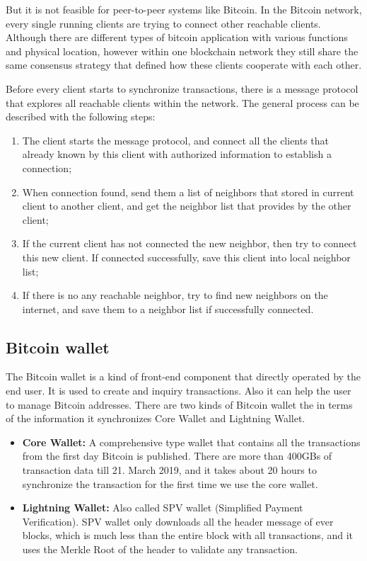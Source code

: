 \documentclass[runningheads]{llncs}
\begin{document}
But it is not feasible for peer-to-peer systems like Bitcoin. In the Bitcoin network, every single running clients are trying to connect other reachable clients. Although there are different types of bitcoin application with various functions and physical location, however within one blockchain network they still share the same consensus strategy that defined how these clients cooperate with each other.

Before every client starts to synchronize transactions, there is a message protocol that explores all reachable clients within the network\cite{asharaf2017decentralized}. The general process can be described with the following steps:

\begin{enumerate}
	\item The client starts the message protocol, and connect all the clients that already known by this client with authorized information to establish a connection;
	\item When connection found, send them a list of neighbors that stored in current client to another client, and get the neighbor list that provides by the other client;
	\item If the current client has not connected the new neighbor, then try to connect this new client. If connected successfully, save this client into local neighbor list;
	\item If there is no any reachable neighbor, try to find new neighbors on the internet, and save them to a neighbor list if successfully connected.
\end{enumerate}

\subsection{Bitcoin wallet}

The Bitcoin wallet is a kind of front-end component that directly operated by the end user. It is used to create and inquiry transactions. Also it can help the user to manage Bitcoin addresses. There are two kinds of Bitcoin wallet the in terms of the information it synchronizes Core Wallet and Lightning Wallet.


\begin{itemize}
	\item \textbf{Core Wallet:} A comprehensive type wallet that contains all the transactions from the first day Bitcoin is published. There are more than 400GBs of transaction data till 21. March 2019, and it takes about 20 hours to synchronize the transaction for the first time we use the core wallet. 
	\item \textbf{Lightning Wallet: } Also called SPV wallet (Simplified Payment Verification). SPV wallet only downloads all the header message of ever blocks, which is much less than the entire block with all transactions, and it uses the Merkle Root of the header to validate any transaction. 
\end{itemize}
\end{document}
